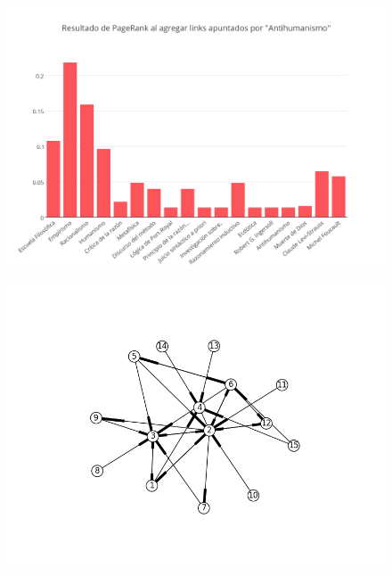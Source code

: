 \documentclass[a4paper]{article}
\begin{document}
\begin{figure}
  \begin{center}
	\includegraphics[scale=0.80]{imagenes/Exp3/after}
	\label{after3}
  \end{center}
\end{figure}

\begin{figure}
  \begin{center}
	\includegraphics[scale=0.80]{imagenes/Exp3/grafobefore}
	\label{gbefore3}
  \end{center}
\end{figure}
\end{document}
